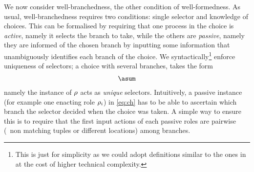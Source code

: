 \bigskip

We now consider well-branchedness, the other condition of
well-formedness.
%
As usual, well-branchedness requires two conditions: single selector
and knowledge of choices.
%
This can be formalised by requiring that one process in the choice is
\emph{active}, namely it selects the branch to take, while the others
are \emph{passive}, namely they are informed of the chosen branch by
inputting some information that unambiguously identifies each branch
of the choice.
%
We syntactically\footnote{
%
  This is just for simplicity as we could adopt definitions similar to
  the ones in \cite{gt16,gt17} at the cost of higher technical
  complexity.
%
} enforce uniqueness of selectors; a choice with several branches,
takes the form
\begin{align}
  \asum\label{eq:ch}
\end{align}
namely the instance of $\rho$ acts as \emph{unique} selectors.
%
Intuitively, a passive instance (for example one enacting role
$\rho_i$) in \eqref{eq:ch} has to be able to ascertain which branch
the selector decided when the choice was taken.
%
A simple way to ensure this is to require that the first input actions
of each passive roles are pairwise  (\ie\ non matching
tuples or different locations) among branches.
%

